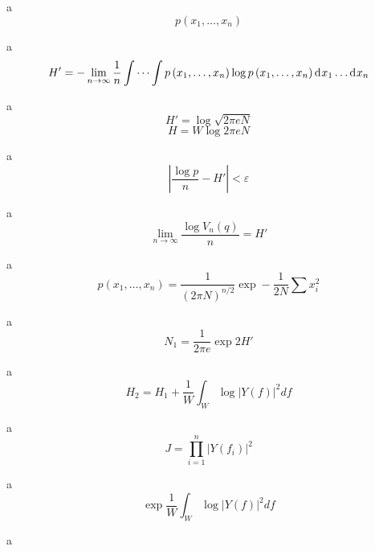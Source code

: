 a\\

\begin{equation}
p\left ( x_{1}, \ldots ,x_{n}\right )
\end{equation}

a\\

\begin{equation}
{H}'=-\lim_{n\rightarrow \infty }\frac{1}{n}\int \cdots \int p\left ( x_{1}, \ldots ,x_{n}\right ) \log p\left ( x_{1}, \ldots ,x_{n}\right ) \diff x _{1} \ldots  \diff x _{n}
\end{equation}

a\\

\begin{equation}
{H}'=\log \sqrt{2\pi eN}
\end{equation}
\begin{equation}
H=W\log 2\pi eN
\end{equation}

a\\

\begin{equation}
\left | \frac{\log p}{n} - {H}'\right |< \varepsilon 
\end{equation}

a\\

\begin{equation}
\lim_{n\rightarrow \infty }\frac{\log V_{n}\left ( q \right )}{n}={H}'
\end{equation}

a\\

\begin{equation}
p\left ( x_{1}, \ldots ,x_{n}\right )=\frac{1}{\left ( 2\pi N \right )^{n/2}}\exp -\frac{1}{2N}\sum x_{i}^{2}
\end{equation}

a\\

\begin{equation}
N_{1}=\frac{1}{2\pi e}\exp 2{H}'
\end{equation}

a\\

\begin{equation}
H_{2}=H_{1}+\frac{1}{W}\int_{W}^{\:}\log \left | Y\left ( f \right ) \right |^{2}df
\end{equation}

a\\

\begin{equation}
J=\prod_{i=1}^{n}\left | Y\left ( f_{i} \right )  \right |^{2}
\end{equation}

a\\

\begin{equation}
\exp \frac{1}{W}\int_{W}^{\:}\log \left | Y\left ( f \right ) \right |^{2}df
\end{equation}

a\\



